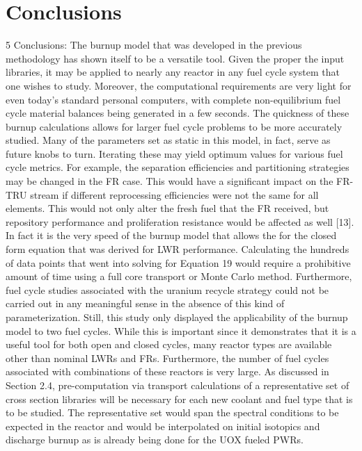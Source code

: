 \section{Conclusions}
\label{1g_sec:conclusions}
5 Conclusions:
The burnup model that was developed in the previous methodology has shown itself to be a versatile tool.  Given the proper the input libraries, it may be applied to nearly any reactor in any fuel cycle system that one wishes to study.  Moreover, the computational requirements are very light for even today’s standard personal computers, with complete non-equilibrium fuel cycle material balances being generated in a few seconds.   
The quickness of these burnup calculations allows for larger fuel cycle problems to be more accurately studied.  Many of the parameters set as static in this model, in fact, serve as future knobs to turn.  Iterating these may yield optimum values for various fuel cycle metrics.  For example, the separation efficiencies and partitioning strategies may be changed in the FR case.  This would have a significant impact on the FR-TRU stream if different reprocessing efficiencies were not the same for all elements.  This would not only alter the fresh fuel that the FR received, but repository performance and proliferation resistance would be affected as well [13].  
In fact it is the very speed of the burnup model that allows the for the closed form equation that was derived for LWR performance.  Calculating the hundreds of data points that went into solving for Equation 19 would require a prohibitive amount of time using a full core transport or Monte Carlo method.  Furthermore, fuel cycle studies associated with the uranium recycle strategy could not be carried out in any meaningful sense in the absence of this kind of parameterization.
Still, this study only displayed the applicability of the burnup model to two fuel cycles.  While this is important since it demonstrates that it is a useful tool for both open and closed cycles, many reactor types are available other than nominal LWRs and FRs.  Furthermore, the number of fuel cycles associated with combinations of these reactors is very large.  As discussed in Section 2.4, pre-computation via transport calculations of a representative set of cross section libraries will be necessary for each new coolant and fuel type that is to be studied.  The representative set would span the spectral conditions to be expected in the reactor and would be interpolated on initial isotopics and discharge burnup as is already being done for the UOX fueled PWRs.
